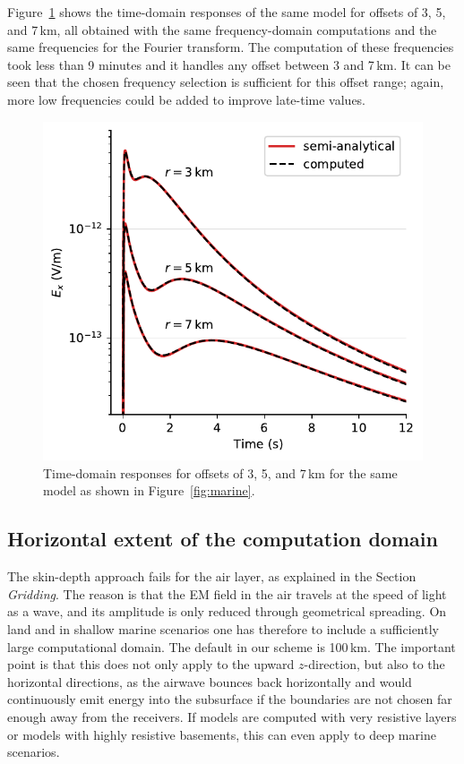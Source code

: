 \documentclass[extra, camera,%
]{gji}
\newlength{\cwidth}
\begin{document}
Figure~\ref{fig:marine-multioffset} shows the time-domain responses of the same
model for offsets of 3, 5, and 7\,km, all obtained with the same
frequency-domain computations and the same frequencies for the Fourier
transform. The computation of these frequencies took less than 9 minutes and it
handles any offset between 3 and 7\,km. It can be seen that the chosen
frequency selection is sufficient for this offset range; again, more low
frequencies could be added to improve late-time values.
%
\begin{figure}
  \centering
  \includegraphics[width=\cwidth]{07-marine-multioffset}
  \caption{Time-domain responses for offsets of 3, 5, and 7\,km for the same
    model as shown in Figure~\ref{fig:marine}.}
  \label{fig:marine-multioffset}
\end{figure}
%


\subsection{Horizontal extent of the computation domain}  %

The skin-depth approach fails for the air layer, as explained in the Section
\emph{Gridding}. The reason is that the EM field in the air travels at the
speed of light as a wave, and its amplitude is only reduced through geometrical
spreading. On land and in shallow marine scenarios one has therefore to include
a sufficiently large computational domain. The default in our scheme is
100\,km. The important point is that this does not only apply to the upward
$z$-direction, but also to the horizontal directions, as the airwave bounces
back horizontally and would continuously emit energy into the subsurface if the
boundaries are not chosen far enough away from the receivers. If models are
computed with very resistive layers or models with highly resistive basements,
this can even apply to deep marine scenarios.
\end{document}
